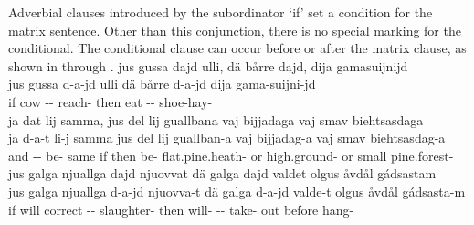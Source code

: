 Adverbial clauses introduced by the subordinator  ‘if’ set a condition for the matrix sentence. Other than this conjunction, there is no special marking for the conditional. 
The conditional clause can occur before or after the matrix clause, as shown in  through .%
\ea\label{conditionalClause1}%
\glll	jus gussa dajd ulli, dä bårre dajd, dija gamasuijnijd\\
	jus gussa d-a-jd ulli dä bårre d-a-jd dija gama-suijni-jd\\
	if cow\BS{} -- reach- then eat\BS{} --  shoe-hay-\\\nopagebreak
{} 
\z
\ea\label{conditionalClause2}%
\glll	ja dat lij samma, jus del lij guallbana vaj bijjadaga vaj smav biehtsasdaga\\
	ja d-a-t li-j samma jus del lij guallban-a vaj bijjadag-a vaj smav biehtsasdag-a\\
	and -- be- same if then be- flat.pine.heath- or high.ground- or small pine.forest-\\\nopagebreak
{} 
\z
\ea\label{conditionalClause3}%
\glll	jus galga njuallga dajd njuovvat dä galga dajd valdet olgus åvdål gádsastam\\
	jus galga njuallga d-a-jd njuovva-t dä galga d-a-jd valde-t olgus åvdål gádsasta-m\\
	if will\BS{} correct -- slaughter- then will- -- take- out before hang-\\\nopagebreak
{} 
\z
{}

